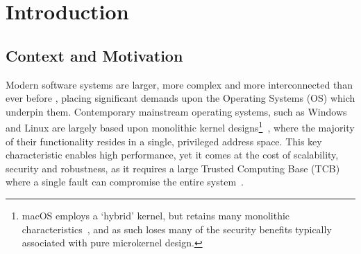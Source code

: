 \chapter{Introduction}
\label{cha:intro}


\section{Context and Motivation}
Modern software systems are larger, more complex and more interconnected than ever before \cite{kleppmann_designing_2017}, placing significant demands upon the Operating Systems (OS) which underpin them. Contemporary mainstream operating systems, such as Windows and Linux are largely based upon monolithic kernel designs\footnote{macOS employs a `hybrid' kernel, but retains many monolithic characteristics~\cite{singh_mac_2006}, and as such loses many of the security benefits typically associated with pure microkernel design.}~\cite{tanenbaum_modern_2015}, where the majority of their functionality resides in a single, privileged address space. This key characteristic enables high performance, yet it comes at the cost of scalability, security and robustness, as it requires a large Trusted Computing Base (TCB) where a single fault can compromise the entire system~\cite{tanenbaum_modern_2015}.

